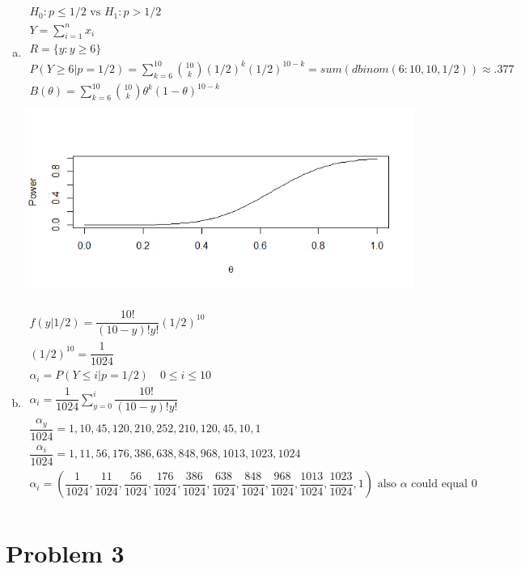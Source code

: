 \documentclass{article}
\newcommand{\sumx}{\sum_{i=1}^{n}x_i}
\newcommand{\ta}{\theta}
\begin{document}
\begin{flushleft}
\begin{enumerate}[(a)]
	\item 
\begin{multline*}\\
H_0:p\leq 1/2 \text{ vs } H_1:p>1/2\\
Y=\sumx\\
R=\{y:y \geq 6 \}\\
P(Y\geq 6|p=1/2)
=\sum_{k=6}^{10}{10 \choose k}(1/2)^k(1/2)^{10-k}=sum(dbinom(6:10,10,1/2))\approx.377\\
B(\ta)=\sum_{k=6}^{10}{10 \choose k}\ta^k(1-\ta)^{10-k}\\
\end{multline*}
\includegraphics[scale=.8]{Rcode/righttailpower.png}
\pagebreak
	\item 
\begin{multline*}\\
f(y|1/2)=\dfrac{10!}{(10-y)!y!}(1/2)^{10}\\
(1/2)^{10}=\dfrac{1}{1024}\\
\alpha_i=P(Y\leq i|p=1/2) \quad 0\leq i\leq 10\\
\alpha_i=\dfrac{1}{1024}\sum_{y=0}^{i}\dfrac{10!}{(10-y)!y!}\\
{\dfrac{\alpha_y}{1024}}= 1,  10,  45, 120, 210, 252, 210, 120,  45,  10, 1\\
\dfrac{\alpha_i}{1024}=1, 11, 56, 176, 386, 638, 848, 968, 1013, 1023, 1024\\
\alpha_i=\left(\dfrac{1}{1024},\dfrac{11}{1024}, \dfrac{56}{1024},\dfrac{176}{1024},\dfrac{386}{1024},\dfrac{638}{1024},\dfrac{848}{1024},\dfrac{968}{1024},\dfrac{1013}{1024}, \dfrac{1023}{1024},1\right)
\text{ also } \alpha \text{ could equal } 0\\
\end{multline*}
	
\end{enumerate}

	\section*{Problem 3}
	

\end{flushleft}
\end{document}
